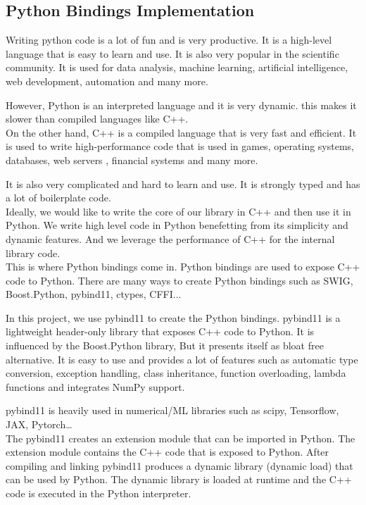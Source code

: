 \begin{spacing}{1.2}
    \section{Python Bindings Implementation}
    Writing python code is a lot of fun and is very productive. It is a high-level language that is
    easy to learn and use. It is also very popular in the scientific community. It is used for
    data analysis, machine learning, artificial intelligence, web development, automation and many more.

    However, Python is an interpreted language and it is very dynamic. this makes it slower than
    compiled languages like C++. \\

    On the other hand, C++ is a compiled language that is very fast and efficient. It is used to
    write high-performance code that is used in games, operating systems, databases, web servers
    , financial systems and many more.

    It is also very complicated and hard to learn and use. It is strongly typed and has a lot of
    boilerplate code.\\

    Ideally, we would like to write the core of our library in C++ and then use it in Python.
    We write high level code in Python benefetting from its simplicity and dynamic features. And
    we leverage the performance of C++ for the internal library code.\\
    This is where Python bindings come in. Python bindings are used to expose C++ code to Python.
    There are many ways to create Python bindings such as SWIG, Boost.Python, pybind11, ctypes, CFFI...

    In this project, we use pybind11 to create the Python bindings. pybind11 is a lightweight header-only
    library that exposes C++ code to Python.
    It is influenced by the Boost.Python library, But it presents itself as bloat free alternative.
    It is easy to use and provides a lot of features such as
    automatic type conversion, exception handling, class inheritance, function overloading, lambda functions and
    integrates NumPy support.

    pybind11 is heavily used in numerical/ML libraries such as scipy, Tensorflow, JAX, Pytorch\dots\\

    The pybind11 creates an extension module that can be imported in Python. The extension module
    contains the C++ code that is exposed to Python. After compiling and linking pybind11 produces
    a dynamic library (dynamic load) that can be used by Python. The dynamic library is loaded
    at runtime and the C++ code is executed in the Python interpreter.\\


\end{spacing}

